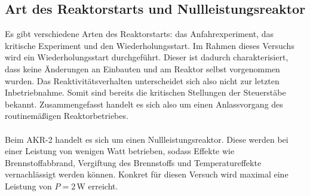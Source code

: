 \documentclass[german,  %
parskip=full,  %
]{scrartcl}
\begin{document}
\subsection{Art des Reaktorstarts und Nullleistungsreaktor}
Es gibt verschiedene Arten des Reaktorstarts: das Anfahrexperiment, das kritische Experiment und den Wiederholungsstart. Im Rahmen dieses Versuchs wird ein Wiederholungsstart durchgeführt. Dieser ist dadurch charakterisiert, dass keine Änderungen an Einbauten und am Reaktor selbst vorgenommen wurden. Das Reaktivitätsverhalten unterscheidet sich also nicht zur letzten Inbetriebnahme. Somit sind bereits die kritischen Stellungen der Steuerstäbe bekannt. Zusammengefasst handelt es sich also um einen Anlassvorgang des routinemäßigen Reaktorbetriebes.
\\\\
Beim AKR-2 handelt es sich um einen Nullleistungsreaktor. Diese werden bei einer Leistung von wenigen Watt betrieben, sodass Effekte wie Brennstoffabbrand, Vergiftung des Brennstoffs und Temperatureffekte vernachlässigt werden können. Konkret für diesen Versuch wird maximal eine Leistung von $P = 2$\,W erreicht.
\end{document}
